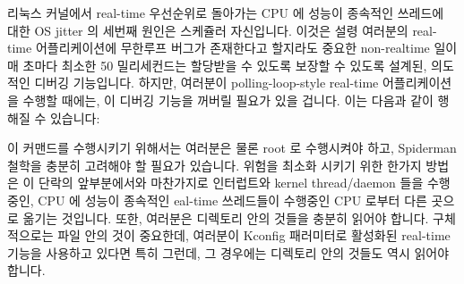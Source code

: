 리눅스 커널에서 real-time 우선순위로 돌아가는 CPU 에 성능이 종속적인 쓰레드에
대한 OS jitter 의 세번째 원인은 스케쥴러 자신입니다.
이것은 설령 여러분의 real-time 어플리케이션에 무한루프 버그가 존재한다고
할지라도 중요한 non-realtime 일이 매 초마다 최소한 50 밀리세컨드는 할당받을 수
있도록 보장할 수 있도록 설계된, 의도적인 디버깅 기능입니다.
하지만, 여러분이 polling-loop-style real-time 어플리케이션을 수행할 때에는, 이
디버깅 기능을 꺼버릴 필요가 있을 겁니다.
이는 다음과 같이 행해질 수 있습니다:

{
	\scriptsize
}

이 커맨드를 수행시키기 위해서는 여러분은 물론 root 로 수행시켜야 하고,
Spiderman 철학을 충분히 고려해야 할 필요가 있습니다.
위험을 최소화 시키기 위한 한가지 방법은 이 단락의 앞부분에서와 마찬가지로
인터럽트와 kernel thread/daemon 들을 수행중인, CPU 에 성능이 종속적인 eal-time
쓰레드들이 수행중인 CPU 로부터 다른 곳으로 옮기는 것입니다.
또한, 여러분은  디렉토리 안의 것들을 충분히
읽어야 합니다.
구체적으로는  파일 안의 것이 중요한데, 여러분이
 Kconfig 패러미터로 활성화된  real-time
기능을 사용하고 있다면 특히 그런데, 그 경우에는 
디렉토리 안의 것들도 역시 읽어야 합니다.

